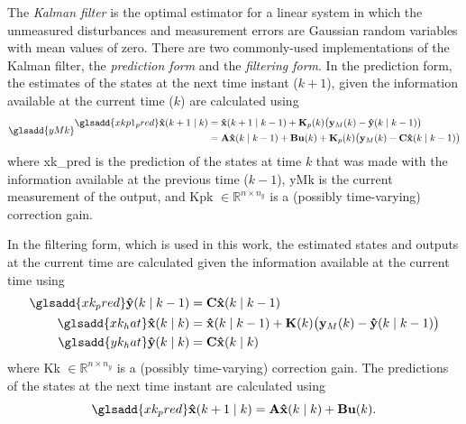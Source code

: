 The \textit{Kalman filter} \citep{kalman_new_1960} is the optimal estimator for a linear system in which the unmeasured disturbances and measurement errors are Gaussian random variables with mean values of zero. There are two commonly-used implementations of the Kalman filter, the \textit{prediction form} and the \textit{filtering form}. In the prediction form, the estimates of the states at the next time instant ($k+1$), given the information available at the current time ($k$) are calculated using
\begin{equation} \glsadd{yMk}
\begin{aligned} \label{eq:xkp1_hat_p}
	\glsadd{xkp1_pred}\mathbf{\hat{x}}(k+1 \mid k) &= \mathbf{\hat{x}}(k+1 \mid k-1) + \mathbf{K}_p(k) \big( \mathbf{y}_M(k) - \mathbf{\hat{y}}(k \mid k-1) \big) \\
	&= \mathbf{A}\mathbf{\hat{x}}(k \mid k-1) + \mathbf{B}\mathbf{u}(k) + \mathbf{K}_p(k) \big( \mathbf{y}_M(k) - \mathbf{C} \mathbf{\hat{x}}(k \mid k-1) \big)
\end{aligned}
\end{equation}
where \gls{xk_pred} is the prediction of the states at time $k$ that was made with the information available at the previous time ($k-1$), \gls{yMk} is the current measurement of the output, and \gls{Kpk} $\in \mathbb{R}^{n \times n_y}$ is a (possibly time-varying) correction gain.

In the filtering form, which is used in this work, the estimated states and outputs at the current time are calculated given the information available at the current time using
\begin{equation} \label{eq:xkyk_hat}
	\begin{aligned}
		\glsadd{xk_pred}\mathbf{\hat{y}}(k \mid k-1) &= \mathbf{C} \mathbf{\hat{x}}(k \mid k-1) \\
		\glsadd{xk_hat}\mathbf{\hat{x}}(k \mid k) &= \mathbf{\hat{x}}(k \mid k-1) + \mathbf{K}(k) \big( \mathbf{y}_M(k) - \mathbf{\hat{y}}(k \mid k-1)  \big) \\
		\glsadd{yk_hat}\mathbf{\hat{y}}(k \mid k) &= \mathbf{C} \mathbf{\hat{x}}(k \mid k)
	\end{aligned}
\end{equation}
where \gls{Kk} $\in \mathbb{R}^{n \times n_y}$ is a (possibly time-varying) correction gain. The predictions of the states at the next time instant are calculated using
\begin{equation} \label{eq:xkp1_hat}
	\glsadd{xk_pred}\mathbf{\hat{x}}(k+1 \mid k) = \mathbf{A} \mathbf{\hat{x}}(k \mid k) + \mathbf{B} \mathbf{u}(k).
\end{equation}

